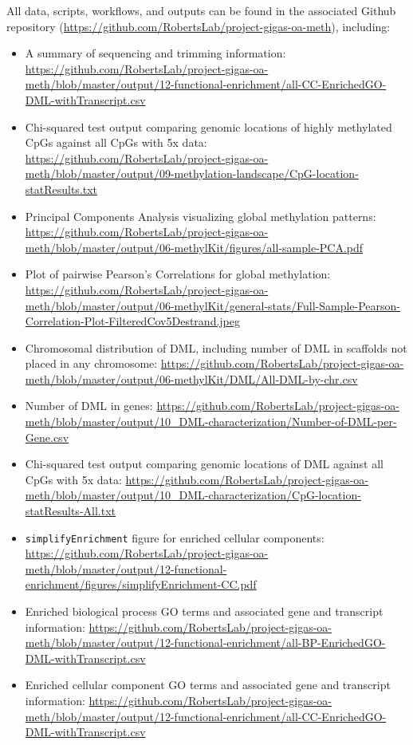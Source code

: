 \documentclass [11pt, proquest] {uwthesis}[2015/03/03]
\providecommand{\tightlist}{%
  \setlength{\itemsep}{0pt}\setlength{\parskip}{0pt}}
\begin{document}
All data, scripts, workflows, and outputs can be found in the associated Github repository (\url{https://github.com/RobertsLab/project-gigas-oa-meth}), including:
\begin{itemize}
\tightlist
\item
  A summary of sequencing and trimming information: \url{https://github.com/RobertsLab/project-gigas-oa-meth/blob/master/output/12-functional-enrichment/all-CC-EnrichedGO-DML-withTranscript.csv}
\item
  Chi-squared test output comparing genomic locations of highly methylated CpGs against all CpGs with 5x data: \url{https://github.com/RobertsLab/project-gigas-oa-meth/blob/master/output/09-methylation-landscape/CpG-location-statResults.txt}
\item
  Principal Components Analysis visualizing global methylation patterns: \url{https://github.com/RobertsLab/project-gigas-oa-meth/blob/master/output/06-methylKit/figures/all-sample-PCA.pdf}
\item
  Plot of pairwise Pearson's Correlations for global methylation: \url{https://github.com/RobertsLab/project-gigas-oa-meth/blob/master/output/06-methylKit/general-stats/Full-Sample-Pearson-Correlation-Plot-FilteredCov5Destrand.jpeg}
\item
  Chromosomal distribution of DML, including number of DML in scaffolds not placed in any chromosome: \url{https://github.com/RobertsLab/project-gigas-oa-meth/blob/master/output/06-methylKit/DML/All-DML-by-chr.csv}
\item
  Number of DML in genes: \url{https://github.com/RobertsLab/project-gigas-oa-meth/blob/master/output/10_DML-characterization/Number-of-DML-per-Gene.csv}
\item
  Chi-squared test output comparing genomic locations of DML against all CpGs with 5x data: \url{https://github.com/RobertsLab/project-gigas-oa-meth/blob/master/output/10_DML-characterization/CpG-location-statResults-All.txt}
\item
  \texttt{simplifyEnrichment} figure for enriched cellular components: \url{https://github.com/RobertsLab/project-gigas-oa-meth/blob/master/output/12-functional-enrichment/figures/simplifyEnrichment-CC.pdf}
\item
  Enriched biological process GO terms and associated gene and transcript information: \url{https://github.com/RobertsLab/project-gigas-oa-meth/blob/master/output/12-functional-enrichment/all-BP-EnrichedGO-DML-withTranscript.csv}
\item
  Enriched cellular component GO terms and associated gene and transcript information: \url{https://github.com/RobertsLab/project-gigas-oa-meth/blob/master/output/12-functional-enrichment/all-CC-EnrichedGO-DML-withTranscript.csv}
\end{itemize}
\end{document}
